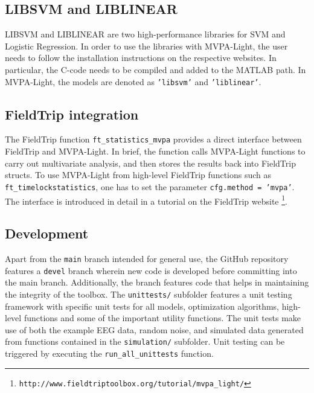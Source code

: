 \documentclass[utf8]{frontiersSCNS} %
\newcommand{\ttt}[1]{\texttt{#1}}
\begin{document}
\subsection{LIBSVM and LIBLINEAR}

LIBSVM \citep{Chang2011LIBSVM:Machines} and LIBLINEAR \citep{Fan2008} are two high-performance libraries for SVM and Logistic Regression. In order to use the libraries with MVPA-Light, the user needs to follow the installation instructions on the respective websites. In particular, the C-code needs to be compiled and added to the MATLAB path. In MVPA-Light, the models are denoted as \ttt{'libsvm'} and \ttt{'liblinear'}.

\subsection{FieldTrip integration}

The FieldTrip \citep{Oostenveld2011} function \ttt{ft\_statistics\_mvpa} provides a direct interface between FieldTrip and MVPA-Light. In brief, the function calls MVPA-Light functions to carry out multivariate analysis, and then stores the results back into FieldTrip structs. To use MVPA-Light from high-level FieldTrip functions such as \ttt{ft\_timelockstatistics}, one has to set the parameter \ttt{cfg.method = 'mvpa'}. The interface is introduced in detail in a tutorial on the FieldTrip website \footnote{\ttt{http://www.fieldtriptoolbox.org/tutorial/mvpa\_light/}}.

\subsection{Development}\label{sec:development}

Apart from the \ttt{main} branch intended for general use, the GitHub repository features a \ttt{devel} branch wherein new code is developed before committing into the main branch. Additionally, the branch features code that helps in maintaining the integrity of the toolbox. The \ttt{unittests/} subfolder features a unit testing framework with specific unit tests for all models, optimization algorithms, high-level functions and some of the important utility functions. The unit tests make use of both the example EEG data, random noise, and simulated data generated from functions contained in the \ttt{simulation/} subfolder. Unit testing can be triggered by executing the \ttt{run\_all\_unittests} function.
\end{document}
